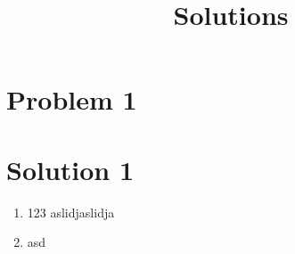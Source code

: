 \documentclass{article}
\begin{document}


\section*{Problem 1}

\section*{Solution 1}
\title{Solutions}
\begin{enumerate}
        \item 123
aslidjaslidja
        \item asd

\end{enumerate}
\end{document}
